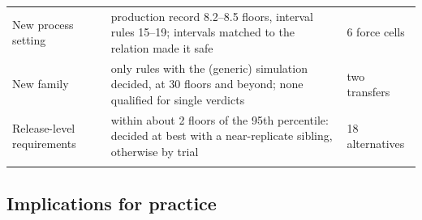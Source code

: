 \documentclass[pdflatex,sn-basic,lineno]{sn-jnl}
\providecommand{\DIFaddbegin}{} %
\providecommand{\DIFaddend}{} %
\providecommand{\DIFdelbegin}{} %
\providecommand{\DIFdelend}{} %
\providecommand{\DIFaddendFL}{} %
\newcommand{\DIFscaledelfig}{0.5}
\newlength{\DIFdelgraphicswidth} %
\newlength{\DIFdelgraphicsheight} %
\newcommand{\DIFaddincludegraphics}[2][]{{\color{blue}\fbox{\DIFOincludegraphics[#1]{#2}}}} %
\newcommand{\DIFdelincludegraphics}[2][]{%
\sbox{\DIFdelgraphicsbox}{\DIFOincludegraphics[#1]{#2}}%
\settoboxwidth{\DIFdelgraphicswidth}{\DIFdelgraphicsbox} %
\settoboxtotalheight{\DIFdelgraphicsheight}{\DIFdelgraphicsbox} %
\scalebox{\DIFscaledelfig}{%
\parbox[b]{\DIFdelgraphicswidth}{\usebox{\DIFdelgraphicsbox}\\[-\baselineskip] \rule{\DIFdelgraphicswidth}{0em}}\llap{\resizebox{\DIFdelgraphicswidth}{\DIFdelgraphicsheight}{%
\setlength{\unitlength}{\DIFdelgraphicswidth}%
\begin{picture}(1,1)%
\thicklines\linethickness{2pt} %
{\color[rgb]{1,0,0}\put(0,0){\framebox(1,1){}}}%
{\color[rgb]{1,0,0}\put(0,0){\line( 1,1){1}}}%
{\color[rgb]{1,0,0}\put(0,1){\line(1,-1){1}}}%
\end{picture}%
}\hspace*{3pt}}} %
} %
\DeclareRobustCommand{\DIFaddbegin}{\DIFOaddbegin \let\includegraphics\DIFaddincludegraphics} %
\DeclareRobustCommand{\DIFaddend}{\DIFOaddend \let\includegraphics\DIFOincludegraphics} %
\DeclareRobustCommand{\DIFdelbegin}{\DIFOdelbegin \let\includegraphics\DIFdelincludegraphics} %
\DeclareRobustCommand{\DIFdelend}{\DIFOaddend \let\includegraphics\DIFOincludegraphics} %
\DeclareRobustCommand{\DIFaddendFL}{\DIFOaddendFL \let\includegraphics\DIFOincludegraphics} %
\begin{document}
\begin{table}[t]
\begin{tabular}{@{}L{2.9cm}L{7.75cm}L{1.85cm}@{}}
New process setting & production record 8.2--8.5 floors, interval rules 15--19; intervals matched to the relation made it safe & 6 force cells \\
New family & only rules with the (generic) simulation decided, at 30 floors and beyond; none qualified for single verdicts & two transfers \\
Release-level requirements & within about 2 floors of the 95th percentile: decided at best with a near-replicate sibling, otherwise by trial & 18 alternatives \\
\botrule
\end{tabular}
\DIFaddendFL \end{table}

\DIFdelbegin %
\DIFdelend \DIFaddbegin \subsection{Implications for practice}
\DIFaddend 
\end{document}
